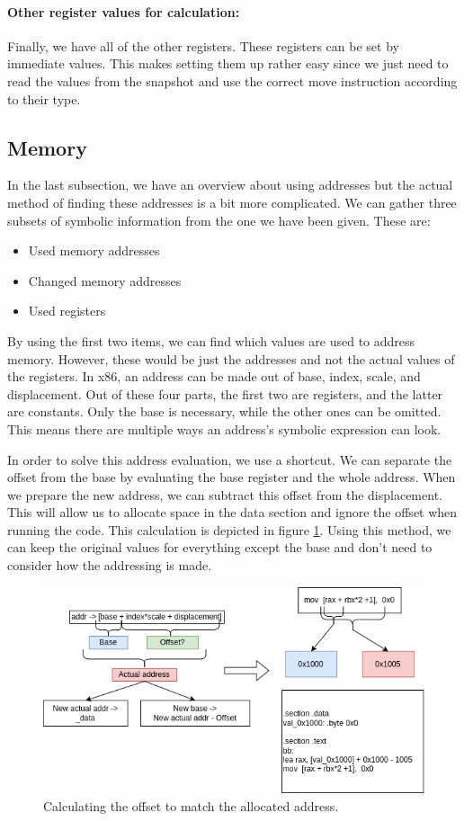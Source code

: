 \paragraph{Other register values for calculation:}
Finally, we have all of the other registers.
These registers can be set by immediate values.
This makes setting them up rather easy since we just need to read the values from the snapshot and use the correct move instruction according to their type. 

\subsection{Memory}
In the last subsection, we have an overview about using addresses but the actual method of finding these addresses is a bit more complicated.
We can gather three subsets of symbolic information from the one we have been given. These are:
\begin{itemize}
    \item Used memory addresses
    \item Changed memory addresses
    \item Used registers
\end{itemize}

By using the first two items, we can find which values are used to address memory.
However, these would be just the addresses and not the actual values of the registers.
In x86, an address can be made out of base, index, scale, and displacement.
Out of these four parts, the first two are registers, and the latter are constants.
Only the base is necessary, while the other ones can be omitted.
This means there are multiple ways an address's symbolic expression can look.

In order to solve this address evaluation, we use a shortcut.
We can separate the offset from the base by evaluating the base register and the whole address.
When we prepare the new address, we can subtract this offset from the displacement.
This will allow us to allocate space in the data section and ignore the offset when running the code.
This calculation is depicted in figure \ref{fig:mem_addr}.
Using this method, we can keep the original values for everything except the base and don't need to consider how the addressing is made.

\begin{figure}[ht]
    \centering
    \includegraphics[width=0.9\linewidth]{figures/mem_addr}
    \caption{Calculating the offset to match the allocated address.}
    \label{fig:mem_addr}
\end{figure}

